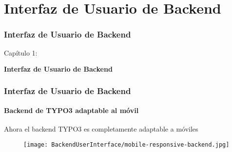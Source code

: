 %

\section{Interfaz de Usuario de Backend}
\begin{frame}[fragile]
	\frametitle{Interfaz de Usuario de Backend}

	\begin{center}\huge{Capítulo 1:}\end{center}
	\begin{center}\huge{\color{typo3darkgrey}\textbf{Interfaz de Usuario de Backend}}\end{center}

\end{frame}


\begin{frame}[fragile]
	\frametitle{Interfaz de Usuario de Backend}
	\framesubtitle{Backend de TYPO3 adaptable al móvil}

	Ahora el backend TYPO3 es completamente adaptable a móviles

	\begin{figure}
		\texttt{[image: BackendUserInterface/mobile-responsive-backend.jpg]}
	\end{figure}

\end{frame}


